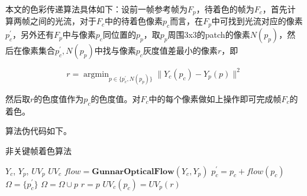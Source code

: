   本文的色彩传递算法具体如下：设前一帧参考帧为$F_p$，待着色的帧为$F_c$，首先计算两帧之间的光流，对于$F_c$中的待着色像素$p_c$而言，在$F_p$中可找到光流对应的像素$p_c^{'}$，另外还有$F_p$中与像素$p_c$同位置的$p_p$，取$p_p$周围3x3的patch的像素$N(p_p)$，然后在像素集合${p_c^{'},N(p_p)}$中找与像素$p_c$灰度值差最小的像素$r$，即

  \begin{equation}
  \label{equ:5-interframe}
    r = \mathop{\arg\min}_{p \in \{p_c^{'},N(p_p)\}} \|Y_c(p_c) - Y_p(p)\|^2
  \end{equation}

  然后取$r$的色度值作为$p_c$的色度值。对$F_c$中的每个像素做如上操作即可完成帧$F_c$的着色。

  算法伪代码如下。

  \begin{algorithm}[H]
  \label{algo:5-interframe}
    \caption*{非关键帧着色算法}
    \begin{algorithmic}[1]
      \Require $Y_c$, $Y_p$, $UV_p$
      \Ensure  $UV_c$
        \State $flow = \textbf{GunnarOpticalFlow}(Y_c, Y_p)$
          \State $p_c^{'} = p_c + flow(p_c)$
          \State $\Omega = \{p_c^{'}\}$
            \State $\Omega = \Omega \cup p$
          \EndFor
              \State $r = p$
            \EndIf
          \EndFor
          \State $UV_c(p_c) = UV_p(r)$
        \EndFor
      \EndFunction
    \end{algorithmic}
  \end{algorithm}